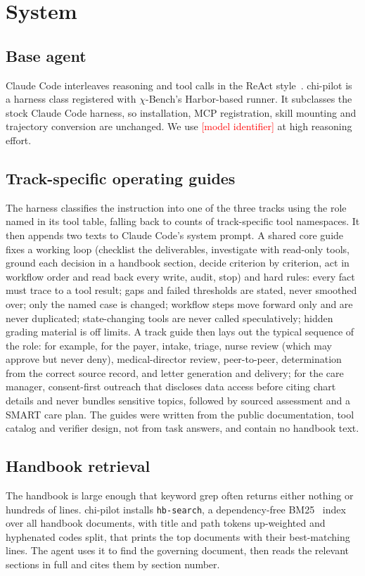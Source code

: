 \documentclass[conference]{IEEEtran}
\newcommand{\pending}[1]{\textcolor{red}{[#1]}}
\newcommand{\chib}{$\chi$-Bench}
\begin{document}
\section{System}
\subsection{Base agent}
Claude Code interleaves reasoning and tool calls in the ReAct style~\cite{react}.
chi-pilot is a harness class registered with \chib{}'s Harbor-based runner. It subclasses the
stock Claude Code harness, so installation, MCP registration, skill mounting and trajectory
conversion are unchanged. We use \pending{model identifier} at high reasoning effort.

\subsection{Track-specific operating guides}
The harness classifies the instruction into one of the three tracks using the role named in its
tool table, falling back to counts of track-specific tool namespaces. It then appends two texts
to Claude Code's system prompt. A shared core guide fixes a working loop (checklist the
deliverables, investigate with read-only tools, ground each decision in a handbook section,
decide criterion by criterion, act in workflow order and read back every write, audit, stop) and
hard rules: every fact must trace to a tool result; gaps and failed thresholds are stated, never
smoothed over; only the named case is changed; workflow steps move forward only and are never
duplicated; state-changing tools are never called speculatively; hidden grading material is off
limits. A track guide then lays out the typical sequence of the role: for example, for the payer,
intake, triage, nurse review (which may approve but never deny), medical-director review,
peer-to-peer, determination from the correct source record, and letter generation and delivery;
for the care manager, consent-first outreach that discloses data access before citing chart
details and never bundles sensitive topics, followed by sourced assessment and a SMART care
plan. The guides were written from the public documentation, tool catalog and verifier design,
not from task answers, and contain no handbook text.

\subsection{Handbook retrieval}
The handbook is large enough that keyword grep often returns either nothing or hundreds of
lines. chi-pilot installs \texttt{hb-search}, a dependency-free BM25~\cite{bm25} index over all
handbook documents, with title and path tokens up-weighted and hyphenated codes split, that
prints the top documents with their best-matching lines. The agent uses it to find the governing
document, then reads the relevant sections in full and cites them by section number.
\end{document}
